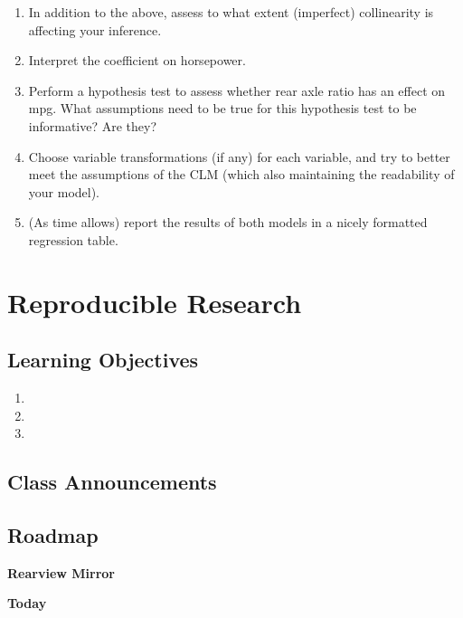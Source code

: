 \documentclass[
]{book}
\providecommand{\tightlist}{%
  \setlength{\itemsep}{0pt}\setlength{\parskip}{0pt}}
\theoremstyle{definition}
\theoremstyle{definition}
\theoremstyle{definition}
\theoremstyle{definition}
\theoremstyle{remark}
\begin{document}
\begin{enumerate}
\def\labelenumi{\arabic{enumi}.}
\setcounter{enumi}{2}
\item
  In addition to the above, assess to what extent (imperfect) collinearity is affecting your inference.
\item
  Interpret the coefficient on horsepower.
\item
  Perform a hypothesis test to assess whether rear axle ratio has an effect on mpg. What assumptions need to be true for this hypothesis test to be informative? Are they?
\item
  Choose variable transformations (if any) for each variable, and try to better meet the assumptions of the CLM (which also maintaining the readability of your model).
\item
  (As time allows) report the results of both models in a nicely formatted regression table.
\end{enumerate}

\hypertarget{reproducible-research}{%
\chapter{Reproducible Research}\label{reproducible-research}}

\hypertarget{learning-objectives-12}{%
\section{Learning Objectives}\label{learning-objectives-12}}

\begin{enumerate}
\def\labelenumi{\arabic{enumi}.}
\tightlist
\item
\item
\item
\end{enumerate}

\hypertarget{class-announcements-11}{%
\section{Class Announcements}\label{class-announcements-11}}

\hypertarget{roadmap-9}{%
\section{Roadmap}\label{roadmap-9}}

\textbf{Rearview Mirror}

\textbf{Today}
\end{document}
